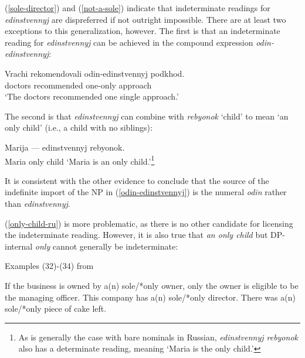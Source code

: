 \documentclass{article}
\begin{document}
(\ref{sole-director}) and (\ref{not-a-sole}) indicate that indeterminate readings for \textit{edinstvennyj} are dispreferred if not outright impossible. There are at least two exceptions to this generalization, however. The first is that an indeterminate reading for \textit{edinstvennyj} can be achieved in the compound expression \textit{odin-edinstvennyj}:

\begin{exe}
	\ex \label{odin-edinstvennyj} \gll Vrachi rekomendovali odin-edinstvennyj podkhod.\\
	doctors recommended one-only approach\\
	`The doctors recommended one single approach.'
\end{exe}

The second is that \textit{edinstvennyj} can combine with \textit{rebyonok} `child' to mean `an only child' (i.e., a child with no siblings):

\begin{exe}
	\ex \label{only-child-ru} Marija --- edinstvennyj rebyonok.\\
	Maria {} only child
	\glt `Maria is an only child.'\footnote{As is generally the case with bare nominals in Russian, \textit{edinstvennyj rebyonok} also has a determinate reading, meaning `Maria is the only child.'}
\end{exe}

It is consistent with the other evidence to conclude that the source of the indefinite import of the NP in (\ref{odin-edinstvennyj}) is the numeral \textit{odin} rather than \textit{edinstvennyj}.

(\ref{only-child-ru}) is more problematic, as there is no other candidate for licensing the indeterminate reading. However, it is also true that \textit{an only child} but DP-internal \textit{only} cannot generally be indeterminate:


\begin{exe}
	\ex Examples (32)-(34) from \citet{cb2012a} \begin{xlist}
		\ex If the business is owned by a(n) sole/*only owner, only the owner is eligible to be the managing officer.
		\ex This company has a(n) sole/*only director.
		\ex There was a(n) sole/*only piece of cake left.
	\end{xlist}
\end{exe}
\end{document}
